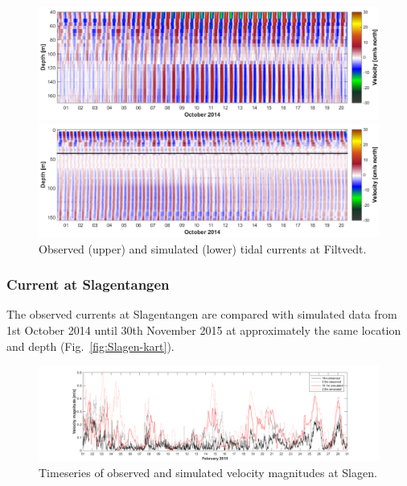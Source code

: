 \begin{figure}[ht]
\centerline{
\includegraphics*[trim=0 0 0 0,clip=true,width=\textwidth]{Figurer/Filtvedt_obs_tide}}
\centerline{
\includegraphics*[trim=0 0 0 0,clip=true,width=\textwidth]{Figurer/Filtvedt_sim_tide}}
\caption{\small
Observed (upper) and simulated (lower) tidal currents at Filtvedt.}
\label{fig:Filtvedt-tide}
\end{figure}


\clearpage 
\subsubsection{Current at Slagentangen}
The observed currents at Slagentangen are compared with simulated data from 1st October 2014 until 30th November 2015 at approximately the same location and depth (Fig.~\ref{fig:Slagen-kart}).


\begin{figure}[ht]
\centerline{
\includegraphics*[trim=3cm 0cm 3cm 0cm,clip=true,width=\textwidth]{Figurer/Slagen_tid}}
\caption{\small
Timeseries of observed and simulated velocity magnitudes at Slagen.}
\label{fig:Slagen-tid}
\end{figure}

